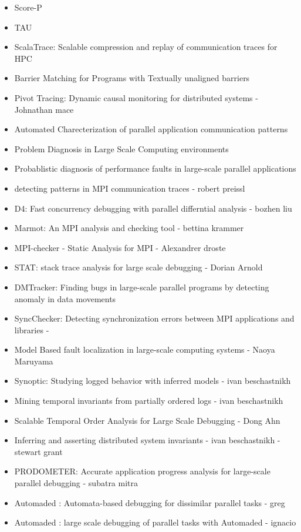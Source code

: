 \begin{itemize}
\item Score-P \cite{scorep}
\item TAU \cite{tau}
\item ScalaTrace: Scalable compression and replay of communication traces for HPC  \cite{scalatrace}
\item Barrier Matching for Programs with Textually unaligned barriers \cite{zhang07}
\item Pivot Tracing: Dynamic causal monitoring for distributed systems - Johnathan mace \cite{pivot}
\item Automated Charecterization of parallel application communication patterns \cite{roth-15}
\item Problem Diagnosis in Large Scale Computing environments \cite{miller06}
\item Probablistic diagnosis of performance faults in large-scale parallel applications \cite{laguna-12}
\item detecting patterns in MPI communication traces - robert preissl \cite{preissl-08}
\item D4: Fast concurrency debugging with parallel differntial analysis - bozhen liu \cite{liu-18}
\item Marmot: An MPI analysis and checking tool - bettina krammer \cite{marmot}
\item MPI-checker - Static Analysis for MPI - Alexandrer droste \cite{mpi-checker}
\item STAT: stack trace analysis for large scale debugging - Dorian Arnold \cite{stat}
\item DMTracker: Finding bugs in large-scale parallel programs by detecting anomaly in data movements \cite{dmtracker}
\item SyncChecker: Detecting synchronization errors between MPI applications and libraries - \cite{syncChecker}
\item Model Based fault localization in large-scale computing systems - Naoya Maruyama \cite{satoshi-08}
\item Synoptic: Studying logged behavior with inferred models - ivan beschastnikh \cite{beschastnikh-synoptic}
\item Mining temporal invariants from partially ordered logs -  ivan beschastnikh \cite{beschastnikh-pologs}
\item Scalable Temporal Order Analysis for Large Scale Debugging - Dong Ahn \cite{Ahn:2009}
\item Inferring and asserting distributed system invariants -  ivan beschastnikh - stewart grant \cite{grant18}
\item PRODOMETER: Accurate application progress analysis for large-scale parallel debugging - subatra mitra \cite{prodometer}
\item Automaded : Automata-based debugging for dissimilar parallel tasks - greg \cite{automaded-GBron}
\item Automaded : large scale debugging of parallel tasks with Automaded - ignacio \cite{automaded-laguna}


\end{itemize}
